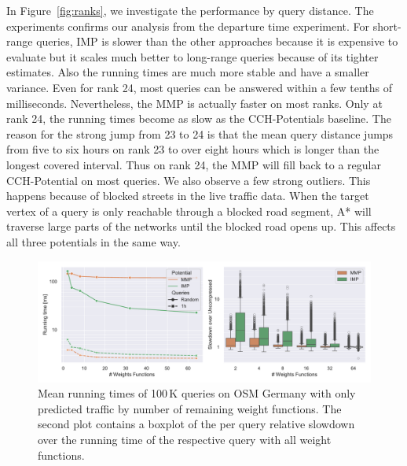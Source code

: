 \documentclass[a4paper,UKenglish,cleveref, autoref, thm-restate,anonymous]{lipics-v2021}
\begin{document}
In Figure~\ref{fig:ranks}, we investigate the performance by query distance.
The experiments confirms our analysis from the departure time experiment.
For short-range queries, IMP is slower than the other approaches because it is expensive to evaluate but it scales much better to long-range queries because of its tighter estimates.
Also the running times are much more stable and have a smaller variance.
Even for rank 24, most queries can be answered within a few tenths of milliseconds.
Nevertheless, the MMP is actually faster on most ranks.
Only at rank 24, the running times become as slow as the CCH-Potentials baseline.
The reason for the strong jump from 23 to 24 is that the mean query distance jumps from five to six hours on rank 23 to over eight hours which is longer than the longest covered interval.
Thus on rank 24, the MMP will fill back to a regular CCH-Potential on most queries.
We also observe a few strong outliers.
This happens because of blocked streets in the live traffic data.
When the target vertex of a query is only reachable through a blocked road segment, A* will traverse large parts of the networks until the blocked road opens up.
This affects all three potentials in the same way.

\begin{figure}
\centering
\includegraphics[width=\linewidth]{fig/compression.pdf}
\caption{
Mean running times of 100\,K queries on OSM Germany with only predicted traffic by number of remaining weight functions.
The second plot contains a boxplot of the per query relative slowdown over the running time of the respective query with all weight functions.
}\label{fig:compression}
\end{figure}
\end{document}
